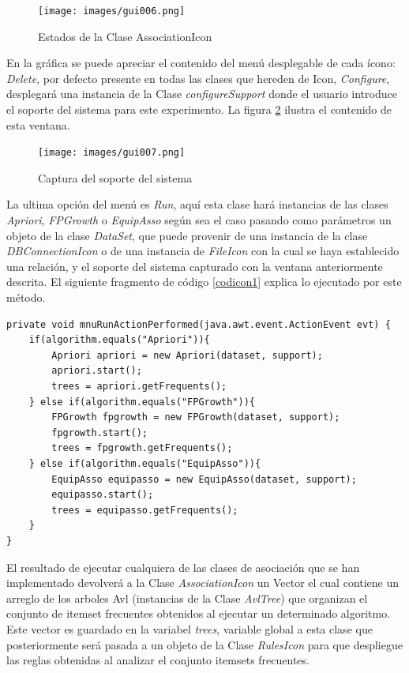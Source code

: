 \begin{figure}[t]
\centering
\texttt{[image: images/gui006.png]}
\caption{Estados de la Clase AssociationIcon}
\label{gui006}
\end{figure}

En la gr\'afica se puede apreciar el contenido del men\'u desplegable de cada \'icono: \textit{Delete}, por
defecto presente en todas las clases que hereden de Icon, \textit{Configure}, desplegar\'a una instancia de la
Clase \textit{configureSupport} donde el usuario introduce el soporte del sistema para este experimento.  La
figura \ref{gui007} ilustra el contenido de esta ventana.\\

\begin{figure}[h]
\centering
\texttt{[image: images/gui007.png]}
\caption{Captura del soporte del sistema}
\label{gui007}
\end{figure}

La ultima opci\'on del men\'u es \textit{Run}, aqu\'i esta clase har\'a instancias de las clases \textit{Apriori},
\textit{FPGrowth} o \textit{EquipAsso} seg\'un sea el caso pasando como par\'ametros un objeto de la clase
\textit{DataSet}, que puede provenir de una instancia de la clase \textit{DBConnectionIcon} o de una instancia de
\textit{FileIcon} con la cual se haya establecido una relaci\'on, y el soporte del sistema capturado con la
ventana anteriormente descrita.  El siguiente fragmento de c\'odigo  \ref{codicon1} explica lo ejecutado por este
m\'etodo.\\

\begin{codigof}[t]
\begin{verbatim}
private void mnuRunActionPerformed(java.awt.event.ActionEvent evt) {
    if(algorithm.equals("Apriori")){
        Apriori apriori = new Apriori(dataset, support);
        apriori.start();
        trees = apriori.getFrequents();
    } else if(algorithm.equals("FPGrowth")){
        FPGrowth fpgrowth = new FPGrowth(dataset, support);
        fpgrowth.start();
        trees = fpgrowth.getFrequents();
    } else if(algorithm.equals("EquipAsso")){
        EquipAsso equipasso = new EquipAsso(dataset, support);
        equipasso.start();
        trees = equipasso.getFrequents();
    }
}
\end{verbatim}
\caption{Ejecuci\'on de un comando con el mouse}
\label{codicon1}
\end{codigof}

El resultado de ejecutar cualquiera de las clases de asociaci\'on que se han implementado devolver\'a a la Clase
\textit{AssociationIcon} un Vector el cual contiene un arreglo de los arboles Avl (instancias de la Clase
\textit{AvlTree}) que organizan el conjunto de itemset frecuentes obtenidos al ejecutar un determinado algoritmo.
 Este vector es guardado en la variabel \textit{trees}, variable global a esta clase que posteriormente ser\'a
pasada a un objeto de la Clase \textit{RulesIcon} para que despliegue las reglas obtenidas al analizar el
conjunto itemsets frecuentes.\\

